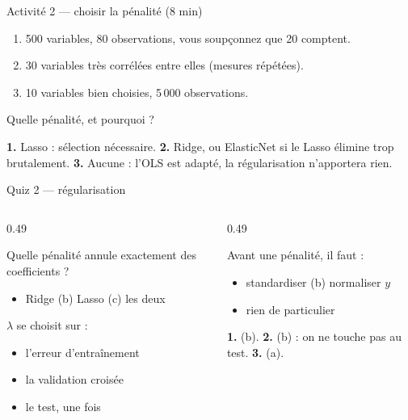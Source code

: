 \begin{frame}{Activité 2 --- choisir la pénalité (8 min)}
\begin{abox}
\begin{enumerate}
  \item 500 variables, 80 observations, vous soupçonnez que 20 comptent.
  \item 30 variables très corrélées entre elles (mesures répétées).
  \item 10 variables bien choisies, 5\,000 observations.
\end{enumerate}
Quelle pénalité, et pourquoi ?
\end{abox}
\vspace{1mm}
\begin{solbox}[Réponses]
\textbf{1.} Lasso : sélection nécessaire.
\textbf{2.} Ridge, ou ElasticNet si le Lasso élimine trop brutalement.
\textbf{3.} Aucune : l'OLS est adapté, la régularisation n'apportera rien.
\end{solbox}
\end{frame}

\begin{frame}{Quiz 2 --- régularisation}
\begin{columns}[t]
\begin{column}{0.49\textwidth}
\begin{qbox}[Question 1]
Quelle pénalité annule exactement des coefficients ?
\begin{itemize}
  \item[(a)] Ridge \quad (b) Lasso \quad (c) les deux
\end{itemize}
\end{qbox}
\begin{qbox}[Question 2]
$\lambda$ se choisit sur :
\begin{itemize}
  \item[(a)] l'erreur d'entraînement
  \item[(b)] la validation croisée
  \item[(c)] le test, une fois
\end{itemize}
\end{qbox}
\end{column}
\begin{column}{0.49\textwidth}
\begin{qbox}[Question 3]
Avant une pénalité, il faut :
\begin{itemize}
  \item[(a)] standardiser \quad (b) normaliser $y$
  \item[(c)] rien de particulier
\end{itemize}
\end{qbox}
\begin{solbox}[Réponses]
\textbf{1.} (b). \quad \textbf{2.} (b) : on ne touche pas au test.
\quad \textbf{3.} (a).
\end{solbox}
\end{column}
\end{columns}
\end{frame}
